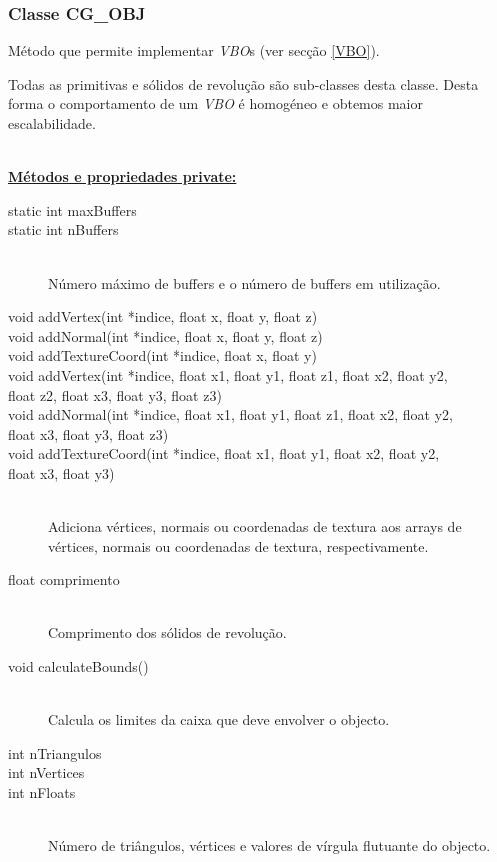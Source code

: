 \documentclass[a5paper,onecolumn, 11pt]{article}
\begin{document}
\clearpage
\subsubsection{Classe CG\_OBJ} \label{classe cg obj}
Método que permite implementar \textit{VBO}s (ver secção \ref{VBO}).

Todas as primitivas e sólidos de revolução são sub-classes desta classe. Desta forma o comportamento de um \textit{VBO} é homogéneo e obtemos maior escalabilidade.

\hfill \\ \underline{\textbf{Métodos e propriedades private:}}

\begin{description}
	\item[static int maxBuffers]
	\item[static int nBuffers] \hfill \\
	Número máximo de buffers e o número de buffers em utilização.

	\item[void addVertex(int *indice, float x, float y, float z)]
	\item[void addNormal(int *indice, float x, float y, float z)]
	\item[void addTextureCoord(int *indice, float x, float y)]
	\item[void addVertex(int *indice, float x1, float y1, float z1, float x2, float y2,]
	\item[float z2, float x3, float y3, float z3)]
	\item[void addNormal(int *indice, float x1, float y1, float z1, float x2, float y2,]
	\item[float x3, float y3, float z3)]
	\item[void addTextureCoord(int *indice, float x1, float y1, float x2, float y2,]
	\item[float x3, float y3)] \hfill \\
	Adiciona vértices, normais ou coordenadas de textura aos arrays de vértices, normais ou coordenadas de textura, respectivamente.

	\item[float comprimento] \hfill \\
	Comprimento dos sólidos de revolução.

	\item[void calculateBounds()] \hfill \\
	Calcula os limites da caixa que deve envolver o objecto.

	\item[int nTriangulos]
	\item[int nVertices]
	\item[int nFloats] \hfill \\
	Número de triângulos, vértices e valores de vírgula flutuante do objecto.


\end{description}
\end{document}
